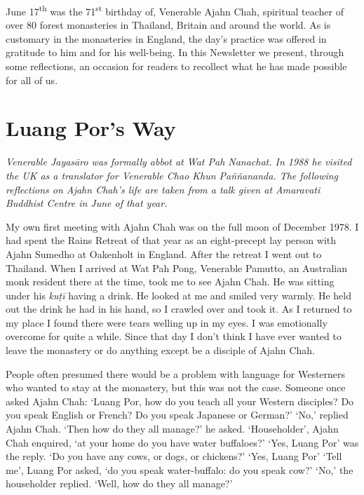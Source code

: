 
June 17\textsuperscript{th} was the 71\textsuperscript{st} birthday of, Venerable Ajahn Chah, spiritual
teacher of over 80 forest monasteries in Thailand, Britain and around
the world. As is customary in the monasteries in England, the day's
practice was offered in gratitude to him and for his well-being. In this
Newsletter we present, through some reflections, an occasion for readers
to recollect what he has made possible for all of us.

\section{Luang Por's Way}

\emph{Venerable Jayasāro was formally abbot at Wat Pah
Nanachat. In 1988 he visited the UK as a translator for Venerable Chao
Khun Paññananda. The following reflections on Ajahn Chah's life are
taken from a talk given at Amaravati Buddhist Centre in June of that
year.}

My own first meeting with Ajahn Chah was on the full moon of December
1978. I had spent the Rains Retreat of that year as an eight-precept lay
person with Ajahn Sumedho at Oakenholt in England. After the retreat I
went out to Thailand. When I arrived at Wat Pah Pong, Venerable Pamutto, 
an Australian monk resident there at the time, took me to see Ajahn
Chah. He was sitting under his \emph{kuṭī} having a drink. He looked at
me and smiled very warmly. He held out the drink he had in his hand, so
I crawled over and took it. As I returned to my place I found there were
tears welling up in my eyes. I was emotionally overcome for quite a
while. Since that day I don't think I have ever wanted to leave the
monastery or do anything except be a disciple of Ajahn Chah. 

People often presumed there would be a problem with language for
Westerners who wanted to stay at the monastery, but this was not the
case. Someone once asked Ajahn Chah: `Luang Por, how do you teach all
your Western disciples? Do you speak English or French? Do you speak
Japanese or German?' `No,' replied Ajahn Chah. `Then how do they all
manage?' he asked. `Householder', Ajahn Chah enquired, `at your home do
you have water buffaloes?' `Yes, Luang Por' was the reply. `Do you have
any cows, or dogs, or chickens?' `Yes, Luang Por' `Tell me', Luang Por
asked, `do you speak water-buffalo: do you speak cow?' `No,' the
householder replied. `Well, how do they all manage?'

